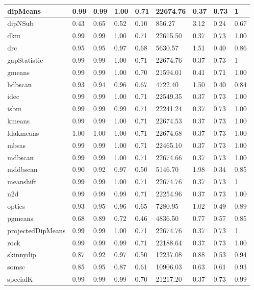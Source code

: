 \begin{table}[H]
\begin{tabular}{|l|l|l|l|l|l|l|l|l|}
\hline
dipMeans & 0.99 & 0.99 & 1.00 & 0.71 & 22674.76 & 0.37 & 0.73 & 1 \\
\hline
dipNSub & 0.43 & 0.65 & 0.52 & 0.10 & 856.27 & 3.12 & 0.24 & 0.67 \\
\hline
dkm & 0.99 & 0.99 & 1.00 & 0.71 & 22615.50 & 0.37 & 0.73 & 1.00 \\
\hline
drc & 0.95 & 0.95 & 0.97 & 0.68 & 5630.57 & 1.51 & 0.40 & 0.86 \\
\hline
gapStatistic & 0.99 & 0.99 & 1.00 & 0.71 & 22674.76 & 0.37 & 0.73 & 1 \\
\hline
gmeans & 0.99 & 0.99 & 1.00 & 0.70 & 21594.01 & 0.41 & 0.71 & 1.00 \\
\hline
hdbscan & 0.93 & 0.94 & 0.96 & 0.67 & 4722.40 & 1.50 & 0.40 & 0.84 \\
\hline
idec & 0.99 & 0.99 & 1.00 & 0.71 & 22549.35 & 0.37 & 0.73 & 1.00 \\
\hline
isbm & 0.99 & 0.99 & 0.99 & 0.71 & 22241.24 & 0.37 & 0.73 & 1.00 \\
\hline
kmeans & 0.99 & 0.99 & 1.00 & 0.71 & 22674.53 & 0.37 & 0.73 & 1.00 \\
\hline
ldakmeans & 1.00 & 1.00 & 1.00 & 0.71 & 22674.68 & 0.37 & 0.73 & 1.00 \\
\hline
mbsas & 0.99 & 0.99 & 1.00 & 0.71 & 22465.10 & 0.37 & 0.73 & 1.00 \\
\hline
mdbscan & 0.99 & 0.99 & 1.00 & 0.71 & 22674.66 & 0.37 & 0.73 & 1.00 \\
\hline
mddbscan & 0.90 & 0.92 & 0.97 & 0.50 & 5146.70 & 1.98 & 0.34 & 0.85 \\
\hline
meanshift & 0.99 & 0.99 & 1.00 & 0.71 & 22674.76 & 0.37 & 0.73 & 1 \\
\hline
n2d & 0.99 & 0.99 & 0.99 & 0.71 & 22254.96 & 0.37 & 0.73 & 1.00 \\
\hline
optics & 0.93 & 0.95 & 0.96 & 0.65 & 7280.95 & 1.02 & 0.49 & 0.89 \\
\hline
pgmeans & 0.68 & 0.89 & 0.72 & 0.46 & 4836.50 & 0.77 & 0.57 & 0.85 \\
\hline
projectedDipMeans & 0.99 & 0.99 & 1.00 & 0.71 & 22674.76 & 0.37 & 0.73 & 1 \\
\hline
rock & 0.99 & 0.99 & 0.99 & 0.71 & 22188.64 & 0.37 & 0.73 & 1.00 \\
\hline
skinnydip & 0.87 & 0.92 & 0.97 & 0.50 & 12237.08 & 0.88 & 0.53 & 0.94 \\
\hline
somsc & 0.85 & 0.95 & 0.87 & 0.61 & 10906.03 & 0.63 & 0.61 & 0.93 \\
\hline
specialK & 0.99 & 0.99 & 0.99 & 0.70 & 21217.20 & 0.37 & 0.73 & 0.99 \\

\end{tabular}
\end{table}
